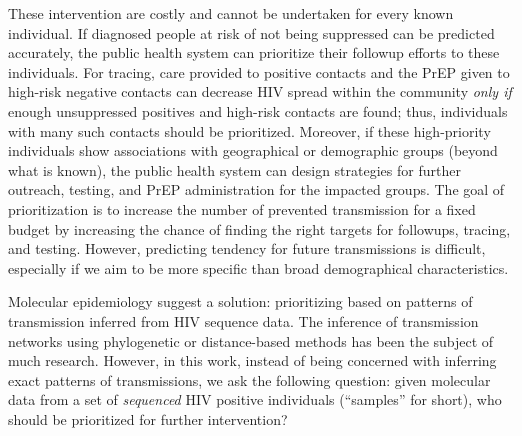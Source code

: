 \documentclass[a4paper,11pt]{article}
\newcommand{\PLWH}{sample\xspace}
\begin{document}
These intervention   are  costly and cannot be undertaken for every known individual.
If diagnosed people at risk of not being suppressed can be predicted accurately, the public health system can prioritize  their followup efforts to these individuals.
For tracing, care provided to positive contacts and the PrEP given to high-risk negative contacts can  decrease HIV spread within the community \textit{only if} enough unsuppressed positives and high-risk contacts are found; thus, individuals with many such contacts should be prioritized.
Moreover, if these high-priority individuals show  associations with geographical or demographic groups (beyond what is known), the public health system can design strategies for further outreach, testing, and PrEP administration for the impacted groups.
The goal of prioritization is to increase the number of prevented transmission for a fixed budget by increasing the chance of finding the right targets for followups, tracing, and testing.
However, predicting tendency for future transmissions is difficult, especially if we aim to be more specific than  broad demographical characteristics. 

Molecular epidemiology suggest a solution:
prioritizing   based on patterns of transmission inferred from HIV sequence data.\supercite{Bbosa2019,Villandre2019,Oster2018,Ragonnet-Cronin2019,Wertheim2018,Wertheim2011,Wertheim2014,Smith2009}
The inference of transmission networks using phylogenetic or distance-based methods has been the subject of much research.\supercite{Leitner2018,Pond2018,Ragonnet-Cronin2013,Prosperi2011}
However, in this work, instead of being concerned with inferring exact patterns of transmissions, we ask the following question:
given molecular data from a set of \textit{sequenced} HIV positive individuals (``\PLWH{s}'' for short), %
who should be prioritized for further intervention? 
\end{document}
